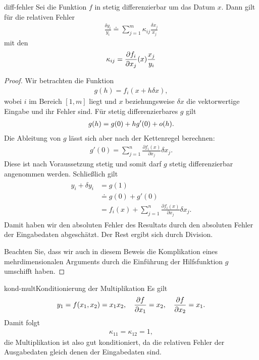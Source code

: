 \begin{Lemma}{diff-fehler}
  Sei die Funktion $f$ in  stetig
  differenzierbar um das Datum $x$. Dann gilt für die relativen Fehler
  \begin{gather*}
    \frac{\delta y_i}{y_i}
    \doteq \sum_{j=1}^m \kappa_{ij}\frac{\delta x_j}{x_j}
  \end{gather*}
  mit den 
  \begin{gather}
    \kappa_{ij} = \frac{\partial f_i}{\partial x_j}(x)
    \frac{x_j}{y_i}
  \end{gather}
\end{Lemma}

\begin{proof}
  Wir betrachten die Funktion
  \begin{gather}
    g(h) = f_i(x + h \delta x),
  \end{gather}
  wobei $i$ im Bereich $[1,m]$ liegt und $x$ beziehungsweise
  $\delta x$ die vektorwertige Eingabe und ihr Fehler sind. Für stetig
  differenzierbares $g$ gilt
  \begin{gather}
    g(h) = g(0) + h g'(0) + o(h).
  \end{gather}
  Die Ableitung von $g$ lässt sich aber nach der Kettenregel berechnen:
  \begin{gather}
    g'(0) = \sum_{j=1}^n \frac{\partial f_i(x)}{\partial x_j} \delta x_j.
  \end{gather}
  Diese ist nach Voraussetzung stetig und somit darf $g$ stetig
  differenzierbar angenommen werden.
  Schließlich gilt
  \begin{gather}
    \begin{split}
      y_i+\delta y_i &= g(1) \\
      &\doteq g(0) + g'(0)\\
      &= f_i(x) + \sum_{j=1}^n \frac{\partial f_i(x)}{\partial x_j} \delta x_j.
    \end{split}
  \end{gather}
  Damit haben wir den absoluten Fehler des Resultats durch den
  absoluten Fehler der Eingabedaten abgeschätzt. Der Rest ergibt sich
  durch Division.
  
  Beachten Sie, dass wir auch in diesem Beweis die Komplikation eines
  mehrdimensionalen Arguments durch die Einführung der Hilfsfunktion
  $g$ umschifft haben.
\end{proof}

\begin{Beispiel*}{kond-mult}{Konditionierung der Multiplikation}
  Es gilt
  \begin{gather}
    y_1 = f(x_1,x_2) = x_1 x_2,
    \quad \frac{\partial f}{\partial x_1} = x_2,
    \quad \frac{\partial f}{\partial x_2} = x_1.
  \end{gather}
  Damit folgt
  \begin{gather}
    \kappa_{11} = \kappa_{12} = 1,
  \end{gather}
  die Multiplikation ist also gut konditioniert, da die relativen
  Fehler der Ausgabedaten gleich denen der Eingabedaten sind.
\end{Beispiel*}

